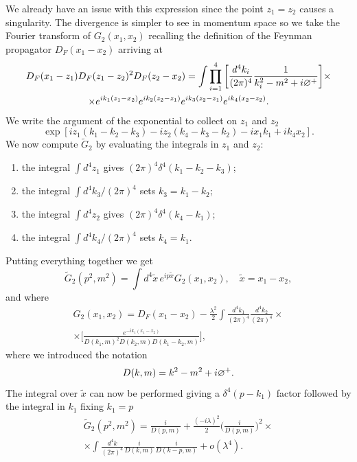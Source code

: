 We already have an issue with this expression since the point $z_1 = z_2$ causes a singularity. The divergence is simpler to see in momentum space so we take the Fourier transform of $G_2(x_1,x_2)$ recalling the definition of the Feynman propagator $D_F(x_1 - x_2)$ arriving at 
\begin{multline}
    D_F(x_1 - z_1)D_F(z_1 - z_2)^2D_F(z_2 - x_2) = \int \prod_{i=1}^4\bigg[\frac{d^4k_i}{(2\pi)^4}\frac{1}{k_i^2 - m^2 + i\varnothing^+}\bigg]\times \\
    \times e^{ik_1(z_1 - x_2)}e^{ik_2(z_2 - z_1)}e^{ik_3(z_2 - z_1)}e^{ik_4(x_2 - z_2)}.
\end{multline}
We write the argument of the exponential to collect on $z_1$ and $z_2$
\begin{equation}
    \exp{[iz_1(k_1 - k_2 - k_3) - iz_2(k_4 - k_3 - k_2) -ix_1k_1 + ik_4x_2]}.
\end{equation}
We now compute $\tilde{G}_2$ by evaluating the integrals in $z_1$ and $z_2$:
\begin{enumerate}
    \item the integral $\int d^4z_1$ gives $(2\pi)^4\delta^4(k_1 - k_2 - k_3)$;
    \item the integral $\int d^4k_3/(2\pi)^4$ sets $k_3 = k_1 - k_2$;
    \item the integral $\int d^4z_2$ gives $(2\pi)^4\delta^4(k_4 - k_1)$;
    \item the integral $\int d^4k_4/(2\pi)^4$ sets $k_4 = k_1$.
\end{enumerate}
Putting everything together we get
\begin{equation}
    \tilde{G}_2(p^2,m^2) = \int d^4\tilde{x}\,e^{ip\tilde{x}}G_2(x_1,x_2),\quad \tilde{x} = x_1 - x_2,
\end{equation}
and where
\begin{multline}
    G_2(x_1,x_2) = D_F(x_1 - x_2) - \frac{\lambda^2}{2}\int \frac{d^4k_1}{(2\pi)^4}\frac{d^4k_2}{(2\pi)^4}\times \\
    \times\bigg[\frac{e^{-ik_1(x_1 - x_2)}}{D(k_1,m)^2D(k_2,m)D(k_1 - k_2,m)}\bigg],
\end{multline}
where we introduced the notation
\begin{equation}
    D(k,m) = k^2 - m^2 + i\varnothing^+.
\end{equation}
The integral over $\tilde{x}$ can now be performed giving a $\delta^4(p - k_1)$ factor followed by the integral in $k_1$ fixing $k_1 = p$
\begin{multline}
    \tilde{G}_2(p^2,m^2) = \frac{i}{D(p,m)} + \frac{(-i\lambda)^2}{2}\bigg(\frac{i}{D(p,m)}\bigg)^2 \times \\
    \times\int \frac{d^4k}{(2\pi)^4}\frac{i}{D(k,m)}\frac{i}{D(k - p,m)} + o(\lambda^4).
\end{multline}
